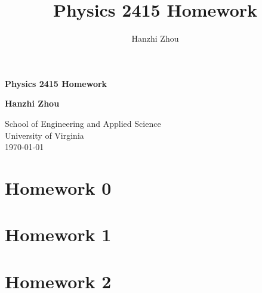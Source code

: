 \documentclass[12pt]{article}
\title{Physics 2415 Homework}
\author{Hanzhi Zhou}
\begin{document}
\begin{titlepage}
  \begin{center}
      \vspace*{1cm}

      \Huge\textbf{Physics 2415 Homework}

 
      \vspace{1.5cm}

      \textbf{Hanzhi Zhou}

      \vfill
      \vspace{0.8cm}

      \Large
      School of Engineering and Applied Science\\
      \vspace{0.2cm}
      University of Virginia\\
      \vspace{0.2cm}
      \today
  \end{center}
  \clearpage
\end{titlepage}

\doublespacing
\tableofcontents
\newpage
\singlespacing

\section{Homework 0}



\newpage

\section{Homework 1}




\newpage

\section{Homework 2}



\end{document}
